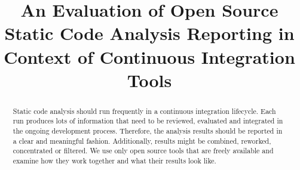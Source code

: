 \documentclass[conference]{IEEEtran}
\begin{document}
%
\title{An Evaluation of Open Source Static Code Analysis Reporting in Context of Continuous Integration Tools}






\author{
	}








\maketitle


\begin{abstract}
Static code analysis should run frequently in a continuous integration lifecycle. Each run produces lots of information that need to be reviewed, evaluated and integrated in the ongoing development process. Therefore, the analysis results should be reported in a clear and meaningful fashion. Additionally, results might be combined, reworked, concentrated or filtered. We use only open source tools that are freely available and examine how they work together and what their results look like.
\end{abstract}


\IEEEpeerreviewmaketitle
\end{document}

